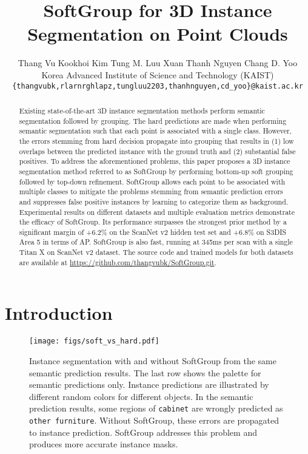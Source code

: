 \documentclass[10pt,twocolumn,letterpaper]{article}
\begin{document}
	
\title{SoftGroup for 3D Instance Segmentation on Point Clouds}
	
	\author{Thang Vu \quad Kookhoi Kim \quad Tung M. Luu \quad Xuan Thanh Nguyen \quad Chang D. Yoo\\
Korea Advanced Institute of Science and Technology (KAIST)\\
		{\tt\small \{thangvubk,rlarnrghlapz,tungluu2203,thanhnguyen,cd\_yoo\}@kaist.ac.kr}
}
	\maketitle
	
\begin{abstract}
Existing state-of-the-art 3D instance segmentation methods perform semantic segmentation followed by grouping. The hard predictions are made when performing semantic segmentation such that each point is associated with a single class. However, the errors stemming from hard decision propagate into grouping that results in (1) low overlaps between the predicted instance with the ground truth and (2) substantial false positives. To address the aforementioned problems, this paper proposes a 3D instance segmentation method referred to as SoftGroup by performing bottom-up soft grouping followed by top-down refinement. SoftGroup allows each point to be associated with multiple classes to mitigate the problems stemming from semantic prediction errors and suppresses false positive instances by learning to categorize them as background. Experimental results on different datasets and multiple evaluation metrics demonstrate the efficacy of SoftGroup. Its performance surpasses the strongest prior method by a significant margin of +6.2\% on the ScanNet v2 hidden test set and +6.8\% on S3DIS Area 5 in terms of AP. SoftGroup is also fast, running at 345ms per scan with a single Titan X on ScanNet v2 dataset. The source code and trained models for both datasets are available at \url{https://github.com/thangvubk/SoftGroup.git}.
		




	\end{abstract}
	
\section{Introduction}
	\label{sec:intro}
	
	\begin{figure}
		\texttt{[image: figs/soft\_vs\_hard.pdf]}
		\caption{Instance segmentation with and without SoftGroup from the same semantic prediction results. The last row shows the palette for semantic predictions only. Instance predictions are illustrated by different random colors for different objects. In the semantic prediction results, some regions of \texttt{cabinet} are wrongly predicted as \texttt{other furniture}. Without SoftGroup, these errors are propagated to instance prediction. SoftGroup addresses this problem and produces more accurate instance masks.}
		\label{fig:introduction}
	\end{figure}
	
\end{document}
